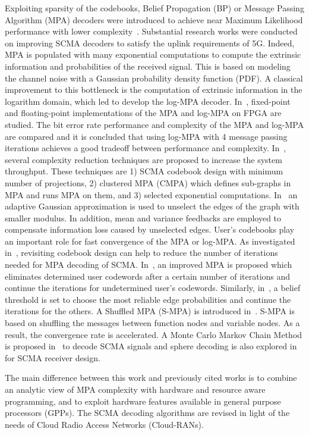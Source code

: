 Exploiting sparsity of the codebooks, Belief Propagation (BP) or Message Passing
Algorithm (MPA) decoders were introduced to achieve near Maximum Likelihood
performance with lower complexity~\cite{Zhang2014a}. Substantial research works
were conducted on improving SCMA decoders to satisfy the uplink requirements of
5G. Indeed, MPA is populated with many exponential computations to compute the
extrinsic information and probabilities of the received signal. This is based on
modeling the channel noise with a Gaussian probability density function (PDF). A
classical improvement to this bottleneck is the computation of extrinsic
information in the logarithm domain, which led to develop the log-MPA decoder.
In~\cite{Liu2016}, fixed-point and floating-point implementations of the MPA and
log-MPA on FPGA are studied. The bit error rate performance and complexity of
the MPA and log-MPA are compared and it is concluded that using log-MPA with 4
message passing iterations achieves a good tradeoff between performance and
complexity. In~\cite{Bayesteh2015}, several complexity reduction techniques are
proposed to increase the system throughput. These techniques are 1) SCMA
codebook design with minimum number of projections, 2) clustered MPA (CMPA)
which defines sub-graphs in MPA and runs MPA on them, and 3) selected
exponential computations. In~\cite{Du2016} an adaptive Gaussian approximation
is used to unselect the edges of the graph with smaller modulus. In addition,
mean and variance feedbacks are employed to compensate information loss caused
by unselected edges. User's codebooks play an important role for fast
convergence of the MPA or log-MPA. As investigated in~\cite{Taherzadeh2014,
Peng2017,Yan2017}, revisiting codebook design can help to reduce the number of
iterations needed for MPA decoding of SCMA. In~\cite{Jia2018}, an improved MPA
is proposed which eliminates determined user codewords after a certain number of
iterations and continue the iterations for undetermined user's codewords.
Similarly, in~\cite{Yang2016}, a belief threshold is set to choose the most
reliable edge probabilities and continue the iterations for the others. A
Shuffled MPA (S-MPA) is introduced in~\cite{Du2016a}. S-MPA is based on
shuffling the messages between function nodes and variable nodes. As a result,
the convergence rate is accelerated. A Monte Carlo Markov Chain Method is
proposed in~\cite{Chen2016} to decode SCMA signals and sphere decoding is also
explored in~\cite{Yang2017,Wei2017} for SCMA receiver design.

The main difference between this work and previously cited works is to combine
an analytic view of MPA complexity with hardware and resource aware programming,
and to exploit hardware features available in general purpose processors (GPPs).
The SCMA decoding algorithms are revised in light of the needs of Cloud Radio
Access Networks (Cloud-RANs).

